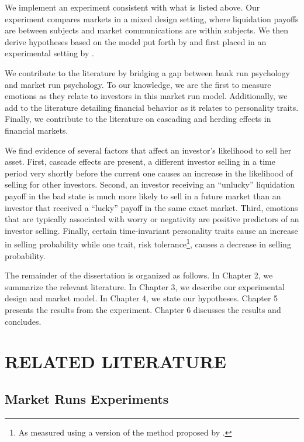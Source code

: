 \documentclass[thesis]{uathesis}
\begin{document}
\begin{body}
We implement an experiment consistent with what is listed above. Our experiment compares markets in a mixed design setting, where liquidation payoffs are between subjects and market communications are within subjects. We then derive hypotheses based on the model put forth by \cite{bernardo2004liquidity} and first placed in an experimental setting by \cite{magnani2020dynamic}.

We contribute to the literature by bridging a gap between bank run psychology and market run psychology. To our knowledge, we are the first to measure emotions as they relate to investors in this market run model. Additionally, we add to the literature detailing financial behavior as it relates to personality traits. Finally, we contribute to the literature on cascading and herding effects in financial markets.

We find evidence of several factors that affect an investor's likelihood to sell her asset. First, cascade effects are present, a different investor selling in a time period very shortly before the current one causes an increase in the likelihood of selling for other investors. Second, an investor receiving an ``unlucky'' liquidation payoff in the bad state is much more likely to sell in a future market than an investor that received a ``lucky'' payoff in the same exact market. Third, emotions that are typically associated with worry or negativity are positive predictors of an investor selling. Finally, certain time-invariant personality traits cause an increase in selling probability while one trait, risk tolerance\footnote{As measured using a version of the method proposed by \cite{gneezy1997experiment}.}, causes a decrease in selling probability.

The remainder of the dissertation is organized as follows. In Chapter 2, we summarize the relevant literature. In Chapter 3, we describe our experimental design and market model. In Chapter 4, we state our hypotheses. Chapter 5 presents the results from the experiment. Chapter 6 discusses the results and concludes.

\chapter{RELATED LITERATURE}

\section{Market Runs Experiments}


\end{body}
\end{document}
